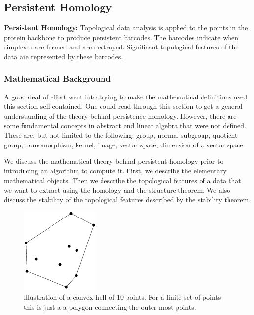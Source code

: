 \documentclass[12pt, a4paper, twocolumn, fullpage]{article}
\theoremstyle{plain}
\theoremstyle{definition}
\theoremstyle{remark}
\begin{document}
\subsection{ Persistent Homology}
\textbf{Persistent Homology: } Topological data analysis is applied to the points in the protein backbone to produce persistent barcodes. The barcodes indicate when simplexes are formed and are destroyed. Significant topological features of the data are represented by these barcodes.


\subsubsection{ Mathematical Background}

A good deal of effort went into trying to make the mathematical definitions used this section self-contained. One could read through this section to get a general understanding of the theory behind persistence homology. However, there are some fundamental concepts in abstract and linear algebra that were not defined. These are, but not limited to the following: group, normal subgroup, quotient group, homomorphism, kernel, image, vector space, dimension of a vector space.

We discuss the mathematical theory behind persistent homology prior to introducing an algorithm to compute it.  First, we describe the elementary mathematical objects. Then we describe the topological features of a data that we want to extract using the homology and the structure theorem. We also discuss the stability of the topological features described by the stability theorem.

\begin{figure}[t]
\centering
    \includegraphics[width=.6\linewidth]{img/mathDef/ConvexHull2D}
    \caption{Illustration of a convex hull of 10 points. For a finite set of points this is just a a polygon connecting the outer most points.}
    \label{ConvexHull}
\end{figure}
\end{document}
